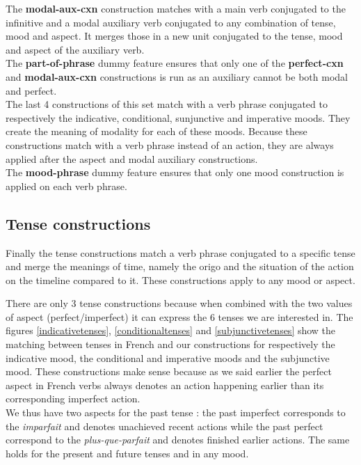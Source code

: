 \documentclass[a4paper,10pt]{article}
\begin{document}
The \textbf{modal-aux-cxn} construction matches with a main verb conjugated to the infinitive and a modal auxiliary verb conjugated to any combination of tense, mood and aspect. It merges those in a new unit conjugated to the tense, mood and aspect of the auxiliary verb. \\

The \textbf{part-of-phrase} dummy feature ensures that only one of the \textbf{perfect-cxn} and \textbf{modal-aux-cxn} constructions is run as an auxiliary cannot be both modal and perfect. \\

The last 4 constructions of this set match with a verb phrase conjugated to respectively the indicative, conditional, sunjunctive and imperative moods. They create the meaning of modality for each of these moods. Because these constructions match with a verb phrase instead of an action, they are always applied after the aspect and modal auxiliary constructions. \\

The \textbf{mood-phrase} dummy feature ensures that only one mood construction is applied on each verb phrase. \\

\subsection{Tense constructions}

Finally the tense constructions match a verb phrase conjugated to a specific tense and merge the meanings of time, namely the origo and the situation of the action on the timeline compared to it. These constructions apply to any mood or aspect. 

There are only 3 tense constructions because when combined with the two values of aspect (perfect/imperfect) it can express the 6 tenses we are interested in. The figures \ref{indicativetenses}, \ref{conditionaltenses} and \ref{subjunctivetenses} show the matching between tenses in French and our constructions for respectively the indicative mood, the conditional and imperative moods and the subjunctive mood. These constructions make sense because as we said earlier the perfect aspect in French verbs always denotes an action happening earlier than its corresponding imperfect action. \\

We thus have two aspects for the past tense : the past imperfect corresponds to the \textit{imparfait} and denotes unachieved recent actions while the past perfect correspond to the \textit{plus-que-parfait} and denotes finished earlier actions. The same holds for the present and future tenses and in any mood. \\
\end{document}
